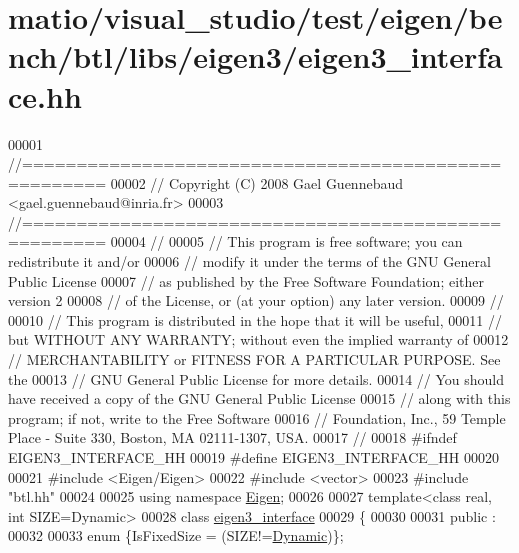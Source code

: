 \hypertarget{matio_2visual__studio_2test_2eigen_2bench_2btl_2libs_2eigen3_2eigen3__interface_8hh_source}{}\section{matio/visual\+\_\+studio/test/eigen/bench/btl/libs/eigen3/eigen3\+\_\+interface.hh}
\label{matio_2visual__studio_2test_2eigen_2bench_2btl_2libs_2eigen3_2eigen3__interface_8hh_source}

\begin{DoxyCode}
00001 \textcolor{comment}{//=====================================================}
00002 \textcolor{comment}{// Copyright (C) 2008 Gael Guennebaud <gael.guennebaud@inria.fr>}
00003 \textcolor{comment}{//=====================================================}
00004 \textcolor{comment}{//}
00005 \textcolor{comment}{// This program is free software; you can redistribute it and/or}
00006 \textcolor{comment}{// modify it under the terms of the GNU General Public License}
00007 \textcolor{comment}{// as published by the Free Software Foundation; either version 2}
00008 \textcolor{comment}{// of the License, or (at your option) any later version.}
00009 \textcolor{comment}{//}
00010 \textcolor{comment}{// This program is distributed in the hope that it will be useful,}
00011 \textcolor{comment}{// but WITHOUT ANY WARRANTY; without even the implied warranty of}
00012 \textcolor{comment}{// MERCHANTABILITY or FITNESS FOR A PARTICULAR PURPOSE.  See the}
00013 \textcolor{comment}{// GNU General Public License for more details.}
00014 \textcolor{comment}{// You should have received a copy of the GNU General Public License}
00015 \textcolor{comment}{// along with this program; if not, write to the Free Software}
00016 \textcolor{comment}{// Foundation, Inc., 59 Temple Place - Suite 330, Boston, MA  02111-1307, USA.}
00017 \textcolor{comment}{//}
00018 \textcolor{preprocessor}{#ifndef EIGEN3\_INTERFACE\_HH}
00019 \textcolor{preprocessor}{#define EIGEN3\_INTERFACE\_HH}
00020 
00021 \textcolor{preprocessor}{#include <Eigen/Eigen>}
00022 \textcolor{preprocessor}{#include <vector>}
00023 \textcolor{preprocessor}{#include "btl.hh"}
00024 
00025 \textcolor{keyword}{using namespace }\hyperlink{namespace_eigen}{Eigen};
00026 
00027 \textcolor{keyword}{template}<\textcolor{keyword}{class} real, \textcolor{keywordtype}{int} SIZE=Dynamic>
00028 \textcolor{keyword}{class }\hyperlink{classeigen3__interface}{eigen3\_interface}
00029 \{
00030 
00031 public :
00032 
00033   \textcolor{keyword}{enum} \{IsFixedSize = (SIZE!=\hyperlink{namespace_eigen_ad81fa7195215a0ce30017dfac309f0b2}{Dynamic})\};

\end{DoxyCode}
